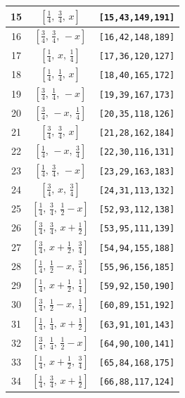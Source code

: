 \documentclass[fleqn,8pt]{jsarticle}
\begin{document}
\begin{longtable}{ccc}
15 & $\left[ \frac{1}{4},\, \frac{3}{4},\, x \right]$ & {\tt [15,43,149,191]} \\ \hline
16 & $\left[ \frac{3}{4},\, \frac{3}{4},\, - x \right]$ & {\tt [16,42,148,189]} \\ \hline
17 & $\left[ \frac{1}{4},\, x,\, \frac{1}{4} \right]$ & {\tt [17,36,120,127]} \\ \hline
18 & $\left[ \frac{1}{4},\, \frac{1}{4},\, x \right]$ & {\tt [18,40,165,172]} \\ \hline
19 & $\left[ \frac{3}{4},\, \frac{1}{4},\, - x \right]$ & {\tt [19,39,167,173]} \\ \hline
20 & $\left[ \frac{3}{4},\, - x,\, \frac{1}{4} \right]$ & {\tt [20,35,118,126]} \\ \hline
21 & $\left[ \frac{3}{4},\, \frac{3}{4},\, x \right]$ & {\tt [21,28,162,184]} \\ \hline
22 & $\left[ \frac{1}{4},\, - x,\, \frac{3}{4} \right]$ & {\tt [22,30,116,131]} \\ \hline
23 & $\left[ \frac{1}{4},\, \frac{3}{4},\, - x \right]$ & {\tt [23,29,163,183]} \\ \hline
24 & $\left[ \frac{3}{4},\, x,\, \frac{3}{4} \right]$ & {\tt [24,31,113,132]} \\ \hline
25 & $\left[ \frac{1}{4},\, \frac{3}{4},\, \frac{1}{2} - x \right]$ & {\tt [52,93,112,138]} \\ \hline
26 & $\left[ \frac{3}{4},\, \frac{3}{4},\, x + \frac{1}{2} \right]$ & {\tt [53,95,111,139]} \\ \hline
27 & $\left[ \frac{3}{4},\, x + \frac{1}{2},\, \frac{3}{4} \right]$ & {\tt [54,94,155,188]} \\ \hline
28 & $\left[ \frac{1}{4},\, \frac{1}{2} - x,\, \frac{3}{4} \right]$ & {\tt [55,96,156,185]} \\ \hline
29 & $\left[ \frac{1}{4},\, x + \frac{1}{2},\, \frac{1}{4} \right]$ & {\tt [59,92,150,190]} \\ \hline
30 & $\left[ \frac{3}{4},\, \frac{1}{2} - x,\, \frac{1}{4} \right]$ & {\tt [60,89,151,192]} \\ \hline
31 & $\left[ \frac{1}{4},\, \frac{1}{4},\, x + \frac{1}{2} \right]$ & {\tt [63,91,101,143]} \\ \hline
32 & $\left[ \frac{3}{4},\, \frac{1}{4},\, \frac{1}{2} - x \right]$ & {\tt [64,90,100,141]} \\ \hline
33 & $\left[ \frac{1}{4},\, x + \frac{1}{2},\, \frac{3}{4} \right]$ & {\tt [65,84,168,175]} \\ \hline
34 & $\left[ \frac{1}{4},\, \frac{3}{4},\, x + \frac{1}{2} \right]$ & {\tt [66,88,117,124]} \\ \hline

\end{longtable}
\end{document}
